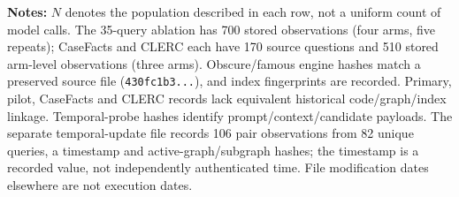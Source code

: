 \footnotesize\raggedright\textbf{Notes:} $N$ denotes the population described in each row, not a uniform count of model calls. The 35-query ablation has 700 stored observations (four arms, five repeats); CaseFacts and CLERC each have 170 source questions and 510 stored arm-level observations (three arms). Obscure/famous engine hashes match a preserved source file (\texttt{430fc1b3...}), and index fingerprints are recorded. Primary, pilot, CaseFacts and CLERC records lack equivalent historical code/graph/index linkage. Temporal-probe hashes identify prompt/context/candidate payloads. The separate temporal-update file records 106 pair observations from 82 unique queries, a timestamp and active-graph/subgraph hashes; the timestamp is a recorded value, not independently authenticated time. File modification dates elsewhere are not execution dates.
\par\endgroup
